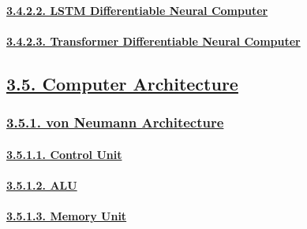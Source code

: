 \documentclass[
]{article}
\begin{document}
\hypertarget{lstm-differentiable-neural-computer}{%
\paragraph{\texorpdfstring{\protect\hyperlink{lstm-differentiable-neural-computer-1}{3.4.2.2.
LSTM Differentiable Neural
Computer}}{3.4.2.2. LSTM Differentiable Neural Computer}}\label{lstm-differentiable-neural-computer}}

\hypertarget{transformer-differentiable-neural-computer}{%
\paragraph{\texorpdfstring{\protect\hyperlink{transformer-differentiable-neural-computer-1}{3.4.2.3.
Transformer Differentiable Neural
Computer}}{3.4.2.3. Transformer Differentiable Neural Computer}}\label{transformer-differentiable-neural-computer}}

\hypertarget{computer-architecture}{%
\subsection{\texorpdfstring{\protect\hyperlink{computer-architecture-1}{3.5.
Computer
Architecture}}{3.5. Computer Architecture}}\label{computer-architecture}}

\hypertarget{von-neumann-architecture}{%
\subsubsection{\texorpdfstring{\protect\hyperlink{von-neumann-architecture-1}{3.5.1.
von Neumann
Architecture}}{3.5.1. von Neumann Architecture}}\label{von-neumann-architecture}}

\hypertarget{control-unit}{%
\paragraph{\texorpdfstring{\protect\hyperlink{control-unit-2}{3.5.1.1.
Control Unit}}{3.5.1.1. Control Unit}}\label{control-unit}}

\hypertarget{alu}{%
\paragraph{\texorpdfstring{\protect\hyperlink{alu-2}{3.5.1.2.
ALU}}{3.5.1.2. ALU}}\label{alu}}

\hypertarget{memory-unit}{%
\paragraph{\texorpdfstring{\protect\hyperlink{memory-unit-2}{3.5.1.3.
Memory Unit}}{3.5.1.3. Memory Unit}}\label{memory-unit}}
\end{document}
